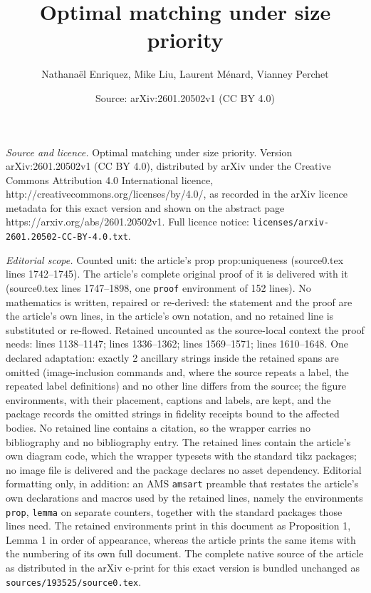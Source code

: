 \documentclass[10pt,a4paper]{amsart}
\title{Optimal matching under size priority}
\author{Nathana\"el Enriquez, Mike Liu, Laurent M\'enard, Vianney Perchet}
\date{Source: arXiv:2601.20502v1 (CC BY 4.0)}
\begin{document}
\maketitle

\noindent\emph{Source and licence.} Optimal matching under size priority. Version arXiv:2601.20502v1 (CC BY 4.0), distributed by arXiv under the Creative Commons Attribution 4.0 International licence, http://creativecommons.org/licenses/by/4.0/, as recorded in the arXiv licence metadata for this exact version and shown on the abstract page https://arxiv.org/abs/2601.20502v1. Full licence notice: \texttt{licenses/arxiv-2601.20502-CC-BY-4.0.txt}.\par\smallskip

\noindent\textit{Editorial scope.} Counted unit: the article's prop prop:uniqueness (source0.tex lines 1742--1745). The article's complete original proof of it is delivered with it (source0.tex lines 1747--1898, one \texttt{proof} environment of 152 lines). No mathematics is written, repaired or re-derived: the statement and the proof are the article's own lines, in the article's own notation, and no retained line is substituted or re-flowed.  Retained uncounted as the source-local context the proof needs: lines 1138--1147; lines 1336--1362; lines 1569--1571; lines 1610--1648.  One declared adaptation: exactly 2 ancillary strings inside the retained spans are omitted (image-inclusion commands and, where the source repeats a label, the repeated label definitions) and no other line differs from the source; the figure environments, with their placement, captions and labels, are kept, and the package records the omitted strings in fidelity receipts bound to the affected bodies.  No retained line contains a citation, so the wrapper carries no bibliography and no bibliography entry.  The retained lines contain the article's own diagram code, which the wrapper typesets with the standard tikz packages; no image file is delivered and the package declares no asset dependency.  Editorial formatting only, in addition: an AMS \texttt{amsart} preamble that restates the article's own declarations and macros used by the retained lines, namely the environments \texttt{prop}, \texttt{lemma} on separate counters, together with the standard packages those lines need.  The retained environments print in this document as Proposition 1, Lemma 1 in order of appearance, whereas the article prints the same items with the numbering of its own full document.  The complete native source of the article as distributed in the arXiv e-print for this exact version is bundled unchanged as \texttt{sources/193525/source0.tex}.
\end{document}

